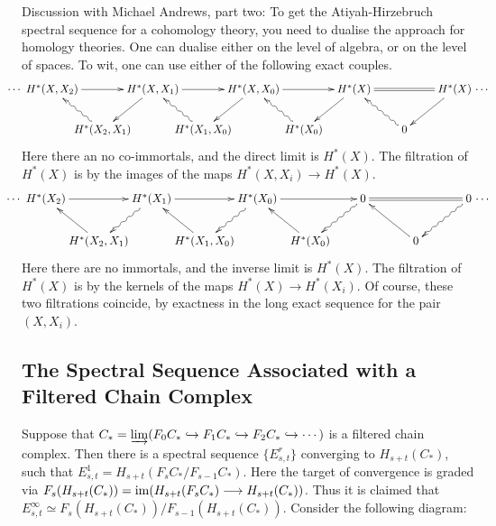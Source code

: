 \documentclass[11pt]{article}
\newcommand{\myheading}[1]
{{\noindent\Large #1}

}
\renewcommand{\myheading}[1]{\subsection{#1}}
\begin{document}
{\color{red}Discussion with Michael Andrews, part two:}
To get the Atiyah-Hirzebruch spectral sequence for a cohomology theory, you need
to dualise the approach for homology theories. One can dualise either on the
level of algebra, or on the level of spaces. To wit, one can use either of the
following exact couples.
\[\xymatrix@!0@C=1.6cm@R=1.28cm{%
\makebox[0cm][r]{$\cdots$\
}H^*(X,X_2)\ar[rr]&&H^*(X,X_1)\ar[rr]\ar[ld]&&H^*(X,X_0)\ar[rr]
\ar[ld]&&H^*(X)\ar[ld]
\ar@{=}[rr]&&H^*(X)\makebox[0cm][l]{\ $\cdots$}\ar[ld]\\
&H^*(X_2,X_1)\ar@{~>}[ul]&&
H^*(X_1,X_0)\ar@{~>}[lu]&&
H^*(X_0)\ar@{~>}[lu]&&
0\ar@{~>}[lu]
}\]
Here there an no co-immortals, and the direct limit is $H^*(X)$. The filtration
of $H^*(X)$ is by the images of the maps $H^*(X,X_i)\to H^*(X)$.
\[\xymatrix@!0@C=1.6cm@R=1.28cm{%
\makebox[0cm][r]{$\cdots$\ }
H^*(X_2)\ar[rr]&&
H^*(X_1)\ar[rr]\ar@{~>}[ld]&&
H^*(X_0)\ar[rr] \ar@{~>}[ld]&&\ar@{~>}[ld]
0\ar@{=}[rr]&&
0\makebox[0cm][l]{\ $\cdots$}\ar@{~>}[ld]\\
&H^*(X_2,X_1)\ar[ul]&&
H^*(X_1,X_0)\ar[lu]&&
H^*(X_0)\ar[lu]&&
0\ar[lu]
}\]
Here there are no immortals, and the inverse limit is $H^*(X)$. The filtration
of $H^*(X)$ is by the kernels of the maps $H^*(X)\to H^*(X_i)$. Of course, these
two filtrations coincide, by exactness in the long exact sequence for the pair
$(X,X_i)$.
\myheading{The Spectral Sequence Associated with a Filtered Chain Complex}
\newcommand{\theexp}[4]{\raisebox{-.1cm}[.5cm][0cm]
{\mbox{$\begin{array}{c}H_{#1}(\frac{F_{#2}}{F_{#3}}) \\
=E^1_{#4} \end{array}$}}}%
Suppose that $C_*=\varinjlim(F_0C_*\hookrightarrow F_1C_*\hookrightarrow
F_2C_*\hookrightarrow\cdots)$ is a filtered chain complex. Then there is a
spectral sequence $\{E^r_{s,t}\}$ converging to $H_{s+t}(C_*)$, such that
$E^1_{s,t}=H_{s+t}(F_sC_*/F_{s-1}C_*)$. Here the target of convergence is graded
via $F_s(H_{s+t}(C_*))=\operatorname{im}(H_{s+t}(F_sC_*)\longrightarrow H_{s+t}(C_*))$. Thus it is claimed
that $E^\infty_{s,t}\simeq F_s(H_{s+t}(C_*))/F_{s-1}(H_{s+t}(C_*))$. Consider
the following diagram:
\end{document}
